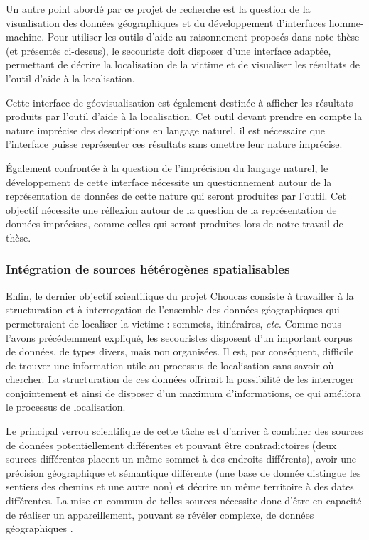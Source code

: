 Un autre point abordé par ce projet de recherche est la question de la
visualisation des données géographiques et du développement
d'interfaces homme-machine. Pour utiliser les outils d'aide au
raisonnement proposés dans note thèse (et présentés ci-dessus), le
secouriste doit disposer d'une interface adaptée, permettant de
décrire la localisation de la victime et de visualiser les résultats
de l'outil d'aide à la localisation. 

Cette interface de géovisualisation est également destinée à afficher
les résultats produits par l'outil d'aide à la localisation. Cet outil
devant prendre en compte la nature imprécise des descriptions en
langage naturel, il est nécessaire que l'interface puisse représenter
ces résultats sans omettre leur nature imprécise.  

Également confrontée à la question de l'imprécision du langage
naturel, le développement de cette interface nécessite un
questionnement autour de la représentation de données de cette nature
qui seront produites par l'outil. Cet objectif nécessite une réflexion
autour de la question de la représentation de données imprécises,
comme celles qui seront produites lors de notre travail de thèse.

\autocite{Viry2019a}

\subsubsection{Intégration de sources hétérogènes spatialisables}
\label{subsec:1-2-3-4}

Enfin, le dernier objectif scientifique du projet Choucas consiste à
travailler à la structuration et à interrogation de l'ensemble des
données géographiques qui permettraient de localiser la victime :
sommets, itinéraires, \emph{etc.} Comme nous l'avons précédemment
expliqué, les secouristes disposent d'un important corpus de données,
de types divers, mais non organisées. Il est, par conséquent,
difficile de trouver une information utile au processus de
localisation sans savoir où chercher. La structuration de ces données
offrirait la possibilité de les interroger conjointement et ainsi de
disposer d'un maximum d'informations, ce qui améliora le processus de
localisation.

Le principal verrou scientifique de cette tâche est d'arriver à
combiner des sources de données potentiellement différentes et pouvant
être contradictoires (\eg deux sources différentes placent un même
sommet à des endroits différents), avoir une précision géographique et
sémantique différente (\eg une base de donnée distingue les sentiers
des chemins et une autre non) et décrire un même territoire à des
dates différentes. La mise en commun de telles sources nécessite donc
d'être en capacité de réaliser un appareillement, pouvant se révéler
complexe, de données géographiques
\autocite{VanDamme2019,Halilali2018}.

